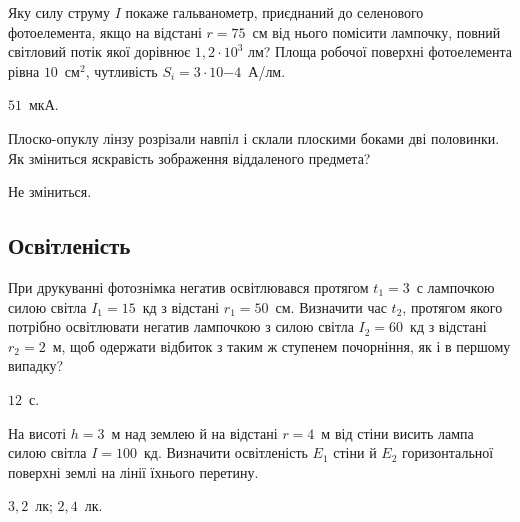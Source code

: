 \begin{problem}%
Яку силу струму $I$ покаже гальванометр, приєднаний до селенового
фотоелемента, якщо на відстані $r = 75$~см від нього помісити лампочку,
повний світловий потік якої дорівнює $1,2\cdot 10^3$ лм? Площа робочої
поверхні фотоелемента рівна $10$~см$^2$, чутливість $S_i = 3\cdot 10{-4}$~А/лм.
\begin{solution}
	$51$~мкА.
\end{solution}
\end{problem}


\begin{problem}%
Плоско-опуклу лінзу розрізали навпіл і склали плоскими боками дві
половинки. Як зміниться яскравість зображення віддаленого предмета?
\begin{solution}
	Не зміниться.
\end{solution}
\end{problem}





\subsection*{Освітленість}

\begin{problem}%
При друкуванні фотознімка негатив освітлювався протягом $t_1 = 3$~с
лампочкою силою світла $I_1 = 15$~кд з відстані $r_1 = 50$~см. Визначити час
$t_2$, протягом якого потрібно освітлювати негатив лампочкою з силою
світла $I_2 = 60$~кд з відстані $r_2 = 2$~м, щоб одержати відбиток з таким ж
ступенем почорніння, як і в першому випадку?
\begin{solution}
	$12$~с.
\end{solution}
\end{problem}


\begin{problem}%
На висоті $h = 3$~м над землею й на відстані $r = 4$~м від стіни висить
лампа силою світла $I = 100$~кд. Визначити освітленість $E_1$ стіни й $E_2$
горизонтальної поверхні землі на лінії їхнього перетину.
\begin{solution}
	$3,2$~лк; $2,4$~лк.
\end{solution}
\end{problem}


